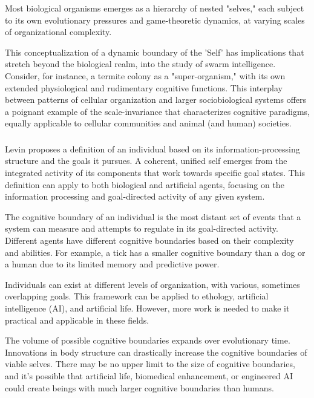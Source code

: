 Most biological organisms emerges as a hierarchy of nested "selves," each subject to its own evolutionary pressures and game-theoretic dynamics, at varying scales of organizational complexity.

This conceptualization of a dynamic boundary of the 'Self' has implications that stretch beyond the biological realm, into the study of swarm intelligence. Consider, for instance, a termite colony as a "super-organism," with its own extended physiological and rudimentary cognitive functions. This interplay between patterns of cellular organization and larger sociobiological systems offers a poignant example of the scale-invariance that characterizes cognitive paradigms, equally applicable to cellular communities and animal (and human) societies.

\subsubsection{}

Levin proposes a definition of an individual based on its information-processing structure and the goals it pursues. A coherent, unified self emerges from the integrated activity of its components that work towards specific goal states. This definition can apply to both biological and artificial agents, focusing on the information processing and goal-directed activity of any given system.

The cognitive boundary of an individual is the most distant set of events that a system can measure and attempts to regulate in its goal-directed activity. Different agents have different cognitive boundaries based on their complexity and abilities. For example, a tick has a smaller cognitive boundary than a dog or a human due to its limited memory and predictive power.

Individuals can exist at different levels of organization, with various, sometimes overlapping goals. This framework can be applied to ethology, artificial intelligence (AI), and artificial life. However, more work is needed to make it practical and applicable in these fields.

The volume of possible cognitive boundaries expands over evolutionary time. Innovations in body structure can drastically increase the cognitive boundaries of viable selves. There may be no upper limit to the size of cognitive boundaries, and it's possible that artificial life, biomedical enhancement, or engineered AI could create beings with much larger cognitive boundaries than humans.

